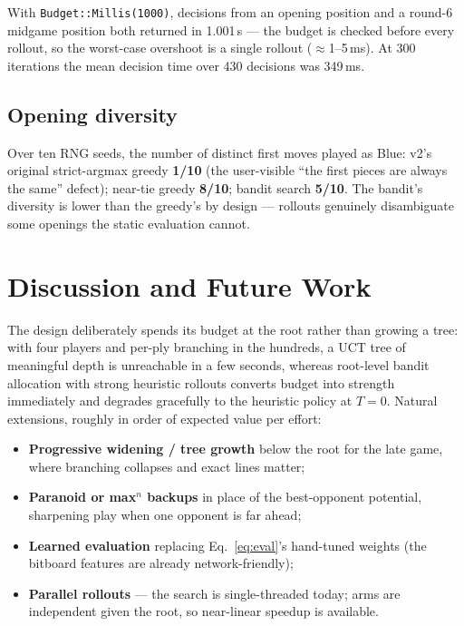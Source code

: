 \documentclass[11pt]{article}
\newcommand{\code}[1]{\texttt{#1}}
\begin{document}
With \code{Budget::Millis(1000)}, decisions from an opening position and a
round-6 midgame position both returned in 1.001\,s --- the budget is checked
before every rollout, so the worst-case overshoot is a single rollout
($\approx$1--5\,ms). At 300 iterations the mean decision time over 430
decisions was 349\,ms.

\subsection{Opening diversity}
\label{sec:diversity}

Over ten RNG seeds, the number of distinct first moves played as Blue: v2's
original strict-argmax greedy \textbf{1/10} (the user-visible ``the first
pieces are always the same'' defect); near-tie greedy \textbf{8/10}; bandit
search \textbf{5/10}. The bandit's diversity is lower than the greedy's by
design --- rollouts genuinely disambiguate some openings the static
evaluation cannot.

\section{Discussion and Future Work}

The design deliberately spends its budget at the root rather than growing a
tree: with four players and per-ply branching in the hundreds, a
UCT tree \cite{browne2012} of meaningful depth is unreachable in a few
seconds, whereas root-level bandit allocation with strong heuristic rollouts
converts budget into strength immediately and degrades gracefully to the
heuristic policy at $T=0$. Natural extensions, roughly in order of expected
value per effort:

\begin{itemize}
  \item \textbf{Progressive widening / tree growth} below the root for the
        late game, where branching collapses and exact lines matter;
  \item \textbf{Paranoid or max$^n$ backups} in place of the
        best-opponent potential, sharpening play when one opponent is far
        ahead;
  \item \textbf{Learned evaluation} replacing Eq.~\eqref{eq:eval}'s
        hand-tuned weights (the bitboard features are already
        network-friendly);
  \item \textbf{Parallel rollouts} --- the search is single-threaded today;
        arms are independent given the root, so near-linear speedup is
        available.
\end{itemize}
\end{document}
